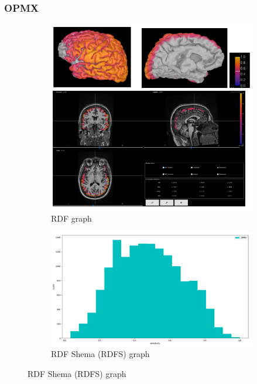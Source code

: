 \documentclass{beamer}
\numberwithin{figure}{section}
\numberwithin{equation}{section}
\begin{document}






\section{}
\begin{frame}
 \frametitle{OPMX}
  

 	\begin{figure}[h]
        \begin{subfigure}[h]{0.53\linewidth} 
            \includegraphics[width=\linewidth]{pictures/OPMX1}
            \caption{\tiny RDF graph}
            \label{fig:rdf_graph}
        \end{subfigure}       
        \begin{subfigure}[h]{0.45\linewidth} 
            \includegraphics[width=\linewidth]{pictures/opmx0}
            \caption{\tiny RDF Shema (RDFS) graph}
            \label{fig:rdfs_graph}
        \end{subfigure}
    \end{figure}

  
\end{frame}
\end{document}
